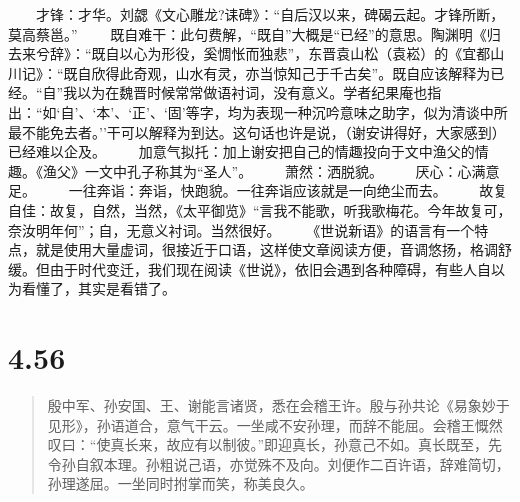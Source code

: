 \documentclass[]{book}
\begin{document}
　　才锋：才华。刘勰《文心雕龙?诔碑》：``自后汉以来，碑碣云起。才锋所断，莫高蔡邕。''
　　既自难干：此句费解，``既自''大概是``已经''的意思。陶渊明《归去来兮辞》：``既自以心为形役，奚惆怅而独悲''，东晋袁山松（袁崧）的《宜都山川记》：``既自欣得此奇观，山水有灵，亦当惊知己于千古矣''。既自应该解释为已经。``自''我以为在魏晋时候常常做语衬词，没有意义。学者纪果庵也指出：``如`自'、`本'、`正'、`固'等字，均为表现一种沉吟意味之助字，似为清谈中所最不能免去者。''干可以解释为到达。这句话也许是说，（谢安讲得好，大家感到）已经难以企及。
　　加意气拟托：加上谢安把自己的情趣投向于文中渔父的情趣。《渔父》一文中孔子称其为``圣人''。
　　萧然：洒脱貌。 　　厌心：心满意足。
　　一往奔诣：奔诣，快跑貌。一往奔诣应该就是一向绝尘而去。
　　故复自佳：故复，自然，当然，《太平御览》``言我不能歌，听我歌梅花。今年故复可，奈汝明年何''；自，无意义衬词。当然很好。
　　《世说新语》的语言有一个特点，就是使用大量虚词，很接近于口语，这样使文章阅读方便，音调悠扬，格调舒缓。但由于时代变迁，我们现在阅读《世说》，依旧会遇到各种障碍，有些人自以为看懂了，其实是看错了。

\section{4.56}\label{section-233}

\begin{quote}
殷中军、孙安国、王、谢能言诸贤，悉在会稽王许。殷与孙共论《易象妙于见形》，孙语道合，意气干云。一坐咸不安孙理，而辞不能屈。会稽王慨然叹曰：``使真长来，故应有以制彼。''即迎真长，孙意己不如。真长既至，先令孙自叙本理。孙粗说己语，亦觉殊不及向。刘便作二百许语，辞难简切，孙理遂屈。一坐同时拊掌而笑，称美良久。
\end{quote}
\end{document}
